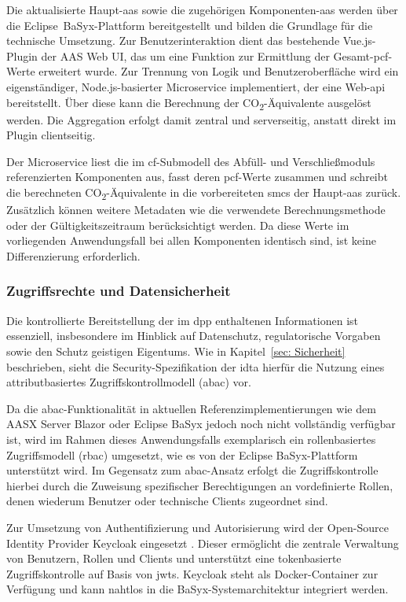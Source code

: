 Die aktualisierte Haupt-\acs{aas} sowie die zugehörigen Komponenten-\acs{aas} werden über die Eclipse~BaSyx-Plattform bereitgestellt und bilden die Grundlage für die technische Umsetzung.
Zur Benutzerinteraktion dient das bestehende Vue.js-Plugin der AAS Web UI, das um eine Funktion zur Ermittlung der Gesamt-\acs{pcf}-Werte erweitert wurde.
Zur Trennung von Logik und Benutzeroberfläche wird ein eigenständiger, Node.js-basierter Microservice implementiert, der eine Web-\acs{api} bereitstellt.
Über diese kann die Berechnung der CO\textsubscript{2}-Äquivalente ausgelöst werden.
Die Aggregation erfolgt damit zentral und serverseitig, anstatt direkt im Plugin clientseitig.

Der Microservice liest die im \acs{cf}-Submodell des Abfüll- und Verschließmoduls referenzierten Komponenten aus, fasst deren \acs{pcf}-Werte zusammen und schreibt die berechneten CO\textsubscript{2}-Äquivalente in die vorbereiteten \acsp{smc} der Haupt-\acs{aas} zurück.
Zusätzlich können weitere Metadaten wie die verwendete Berechnungsmethode oder der Gültigkeitszeitraum berücksichtigt werden.
Da diese Werte im vorliegenden Anwendungsfall bei allen Komponenten identisch sind, ist keine Differenzierung erforderlich.

\subsubsection{Zugriffsrechte und Datensicherheit}

Die kontrollierte Bereitstellung der im \acs{dpp} enthaltenen Informationen ist essenziell, insbesondere im Hinblick auf Datenschutz, regulatorische Vorgaben sowie den Schutz geistigen Eigentums.  
Wie in Kapitel~\ref{sec: Sicherheit} beschrieben, sieht die Security-Spezifikation der \acs{idta} hierfür die Nutzung eines attributbasiertes Zugriffskontrollmodell (\acs{abac}) vor.

Da die \acs{abac}-Funktionalität in aktuellen Referenzimplementierungen wie dem AASX Server Blazor oder Eclipse BaSyx jedoch noch nicht vollständig verfügbar ist, wird im Rahmen dieses Anwendungsfalls exemplarisch ein rollenbasiertes Zugriffsmodell (\acs{rbac}) umgesetzt, wie es von der Eclipse BaSyx-Plattform unterstützt wird.  
Im Gegensatz zum \acs{abac}-Ansatz erfolgt die Zugriffskontrolle hierbei durch die Zuweisung spezifischer Berechtigungen an vordefinierte Rollen, denen wiederum Benutzer oder technische Clients zugeordnet sind.

Zur Umsetzung von Authentifizierung und Autorisierung wird der Open-Source Identity Provider Keycloak eingesetzt \cite{Keycloak}.  
Dieser ermöglicht die zentrale Verwaltung von Benutzern, Rollen und Clients und unterstützt eine tokenbasierte Zugriffskontrolle auf Basis von \acsp{jwt}.  
Keycloak steht als Docker-Container zur Verfügung und kann nahtlos in die BaSyx-Systemarchitektur integriert werden.


